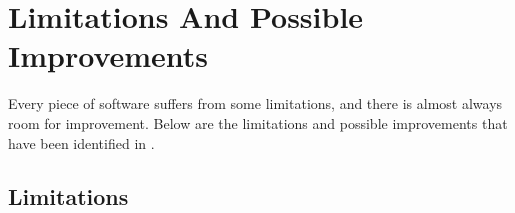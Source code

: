 

\section{Limitations And Possible Improvements}

\label{limitations and improvements in implementation}

Every piece of software suffers from some limitations, and there is almost
always room for improvement.  Below are the limitations and possible
improvements that have been identified in \parsername{}.

\subsection{Limitations}

\label{logging helo}

